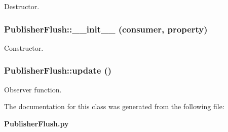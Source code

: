Destructor. 

\subsubsection{\setlength{\rightskip}{0pt plus 5cm}Publisher\-Flush::\_\-\_\-init\_\-\_\- (consumer, property)}\label{classPublisherFlush_PublisherFlusha0}


Constructor. 

\subsubsection{\setlength{\rightskip}{0pt plus 5cm}Publisher\-Flush::update ()}\label{classPublisherFlush_PublisherFlusha2}


Observer function. 



The documentation for this class was generated from the following file:\begin{CompactItemize}
\item 
{\bf Publisher\-Flush.py}\end{CompactItemize}

